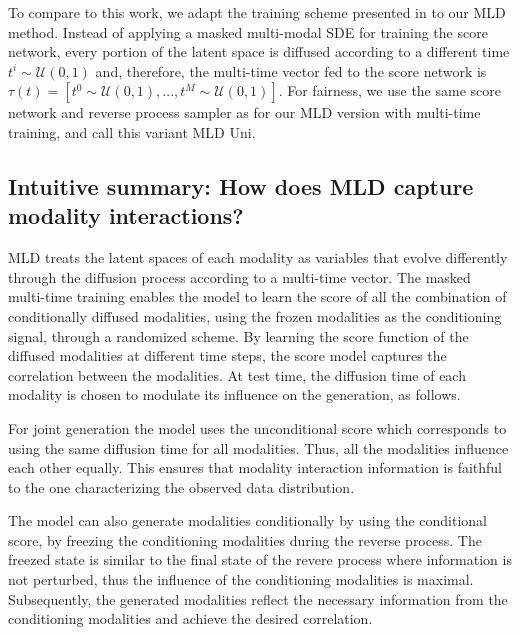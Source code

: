 To compare to this work, we adapt the training scheme presented in \cite{bao2023transformer} to our \gls{MLD} method. Instead of applying a masked multi-modal \gls{SDE} for training the score network, every portion of the latent space is diffused according to a different time $t^i \sim \mathcal{U}(0,1)$ and, therefore, the multi-time vector fed to the score network is $\tau(t) = [t^0 \sim \mathcal{U}(0,1),..., t^M \sim \mathcal{U}(0,1) ] $. For fairness, we use the same score network and reverse process sampler as for our \gls{MLD} version with multi-time training, and call this variant \gls{MLD Uni}.

\subsection{Intuitive summary: How does MLD capture modality interactions?}



\gls{MLD} treats the latent spaces of each modality as variables that evolve differently through the diffusion process according to a multi-time vector. %
The masked multi-time training enables the model to learn the score of all the combination of conditionally diffused modalities, using the frozen modalities as the conditioning signal, through a randomized scheme. By learning the score function of the diffused modalities at different time steps, the score model captures the correlation between the modalities. At test time, the diffusion time of each modality is chosen to modulate its influence on the generation, as follows. 

For joint generation the model uses the unconditional score which corresponds to using the same diffusion time for all modalities. Thus, all the modalities influence each other equally. This ensures that modality interaction information is faithful to the one characterizing the observed data distribution. 

The model can also generate modalities conditionally by using the conditional score, by freezing the conditioning modalities during the reverse process. The freezed state is similar to the final state of the revere process where information is not perturbed, thus the influence of the conditioning modalities is maximal. Subsequently, the generated modalities reflect the necessary information from the conditioning modalities and achieve the desired correlation.



